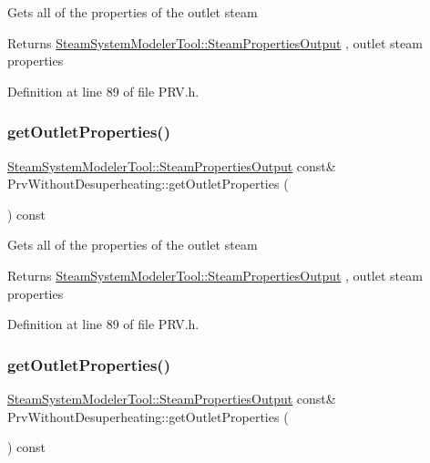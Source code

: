 Gets all of the properties of the outlet steam \begin{DoxyReturn}{Returns}
\hyperlink{struct_steam_system_modeler_tool_1_1_steam_properties_output}{Steam\+System\+Modeler\+Tool\+::\+Steam\+Properties\+Output} , outlet steam properties 
\end{DoxyReturn}


Definition at line 89 of file P\+R\+V.\+h.

\mbox{\label{class_prv_without_desuperheating_afcf1f5d7e6b18643ac8adc9023578147}} 
\subsubsection{\texorpdfstring{get\+Outlet\+Properties()}{getOutletProperties()}\hspace{0.1cm}{\footnotesize\ttfamily [2/3]}}
{\footnotesize\ttfamily \hyperlink{struct_steam_system_modeler_tool_1_1_steam_properties_output}{Steam\+System\+Modeler\+Tool\+::\+Steam\+Properties\+Output} const\& Prv\+Without\+Desuperheating\+::get\+Outlet\+Properties (\begin{DoxyParamCaption}{ }\end{DoxyParamCaption}) const\hspace{0.3cm}{\ttfamily [inline]}}

Gets all of the properties of the outlet steam \begin{DoxyReturn}{Returns}
\hyperlink{struct_steam_system_modeler_tool_1_1_steam_properties_output}{Steam\+System\+Modeler\+Tool\+::\+Steam\+Properties\+Output} , outlet steam properties 
\end{DoxyReturn}


Definition at line 89 of file P\+R\+V.\+h.

\mbox{\label{class_prv_without_desuperheating_afcf1f5d7e6b18643ac8adc9023578147}} 
\subsubsection{\texorpdfstring{get\+Outlet\+Properties()}{getOutletProperties()}\hspace{0.1cm}{\footnotesize\ttfamily [3/3]}}
{\footnotesize\ttfamily \hyperlink{struct_steam_system_modeler_tool_1_1_steam_properties_output}{Steam\+System\+Modeler\+Tool\+::\+Steam\+Properties\+Output} const\& Prv\+Without\+Desuperheating\+::get\+Outlet\+Properties (\begin{DoxyParamCaption}{ }\end{DoxyParamCaption}) const\hspace{0.3cm}{\ttfamily [inline]}}

